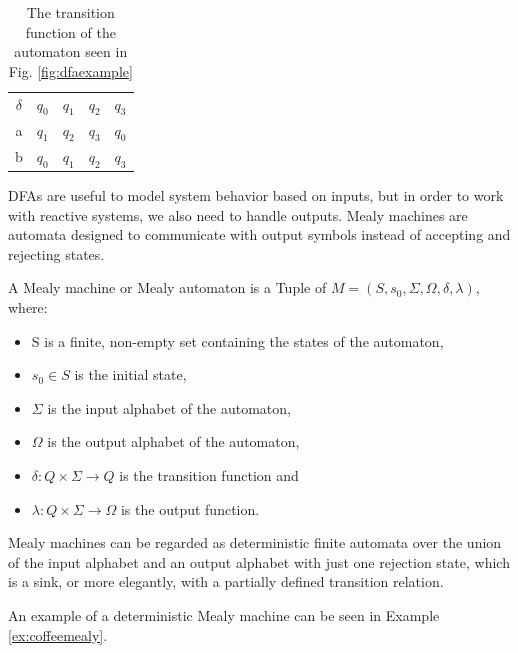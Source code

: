 \begin{table}[H]
\centering
\begin{tabular}{|c|cccc|}
	\hline
	$\delta$ & $q_0$ & $q_1$ & $q_2$ & $q_3$\\ \cline{1-5}
	a & $q_1$ & $q_2$ & $q_3$ & $q_0$ \\	
	b & $q_0$ & $q_1$ & $q_2$ & $q_3$ \\	\hline
\end{tabular}
\caption{The transition function of the automaton seen in Fig. \ref{fig:dfaexample}}
\label{tab:dfaexampledelta}
\end{table}

DFAs are useful to model system behavior based on inputs, but in order to work with reactive systems, we also need to handle outputs. Mealy machines are automata designed to communicate with output symbols instead of accepting and rejecting states.


\begin{definition}
	A Mealy machine or Mealy automaton is a Tuple of $ M=(S,s_{0},\Sigma,\Omega,\delta,\lambda) $, where:
	\begin{itemize}
		\item S is a finite, non-empty set containing the states of the automaton,
		\item $s_{0} \in S$ is the initial state,
		\item $\Sigma$ is the input alphabet of the automaton,
		\item $\Omega$ is the output alphabet of the automaton,
		\item $\delta: Q\times \Sigma \to Q$ is the transition function and
		\item $\lambda: Q\times \Sigma \to \Omega$ is the output function. 
	\end{itemize}
\end{definition}

Mealy machines can be regarded as deterministic finite automata over the union of the input alphabet and an output alphabet with just one rejection state, which is a sink, or more elegantly, with a partially defined transition relation. 

An example of a deterministic Mealy machine can be seen in Example \ref{ex:coffeemealy}.

